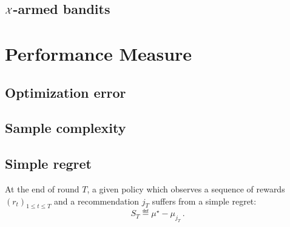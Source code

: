 \subsection{$\mathcal{X}$-armed bandits}

\section{Performance Measure}\label{sec:mab.performance}

\subsection{Optimization error}

\subsection{Sample complexity}

\subsection{Simple regret}

\begin{definition}\label{def:stoch_mab.simple_regret}
\begin{leftbar}[defnbar]
	At the end of round $T$, a given policy which observes a sequence of rewards $(r_t)_{1 \leq t \leq T}$ and a recommendation $j_T$ suffers from a simple regret:
	\[
		S_T \eqdef \mu^{\star} - \mu_{j_T}\,.
	\]
\end{leftbar}
\end{definition}